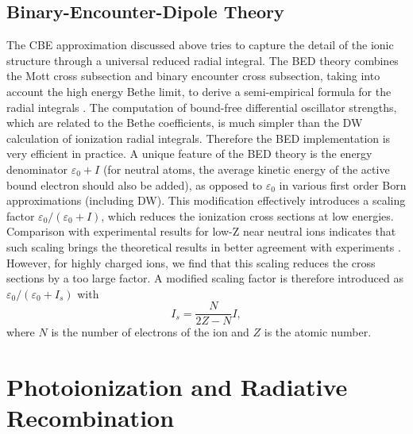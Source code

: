 \subsection{Binary-Encounter-Dipole Theory}
The CBE approximation discussed above tries to capture the detail of the ionic
structure through a universal reduced radial integral. The BED theory combines
the Mott cross subsection and binary encounter cross subsection, taking into
account the high energy Bethe limit, to derive a semi-empirical formula for the
radial integrals \cite{kim:1994a}. The computation of bound-free differential
oscillator strengths, which are related to the Bethe coefficients, is much
simpler than the DW calculation of ionization radial integrals. Therefore the
BED implementation is very efficient in practice. A unique feature of the BED
theory is the energy denominator $\varepsilon_0+I$ (for neutral atoms, the
average kinetic energy of the active bound electron should also be added), as
opposed to $\varepsilon_0$ in various first order Born approximations (including
DW). This modification effectively introduces a scaling factor
$\varepsilon_0/(\varepsilon_0+I)$, which reduces the ionization cross sections
at low energies. Comparison with experimental results for low-Z near neutral
ions indicates that such scaling brings the theoretical results in better
agreement with experiments \cite{kim:1994a}. However, for highly charged ions,
we find that this scaling reduces the cross sections by a too large factor. A
modified scaling factor is therefore introduced as
$\varepsilon_0/(\varepsilon_0+I_s)$ with
\begin{equation}
I_s = \frac{N}{2Z-N}I,
\end{equation}
where $N$ is the number of electrons of the ion and $Z$ is the atomic
number.


\section{Photoionization and Radiative Recombination}
\label{sec:pirr}
